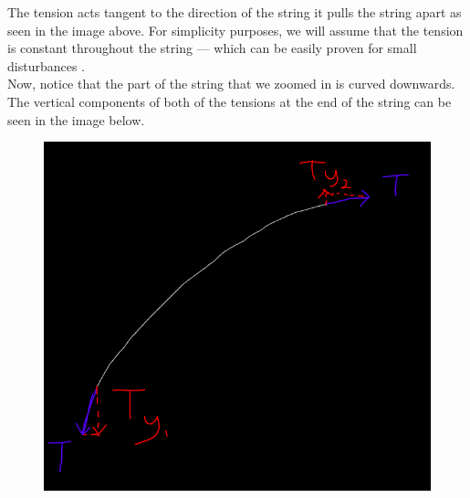 \documentclass[oneside,hidelinks]{book}
\begin{document}
                The tension acts tangent to the direction of the 
                string it pulls the string apart as seen in the image above. 
                For simplicity purposes, we will assume that the tension is
                 constant throughout the string — which can be easily proven
                  for small disturbances .\\

                Now, notice that the part of the string that we 
                zoomed in is curved downwards. 
                The vertical components of both of the tensions at
                 the end of the string can be seen in the image below.
                 \begin{figure}[hbtp]                        
                        \hspace*{4cm}\includegraphics[scale=0.3]{a&b_3.png}
                \end{figure}\\
\end{document}
